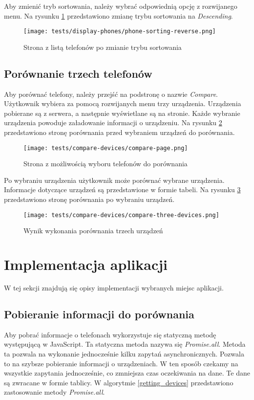 Aby zmienić tryb sortowania, należy wybrać odpowiednią opcję z rozwijanego menu. Na rysunku \ref{reverse_sorting} przedstawiono zmianę trybu sortowania na \textit{Descending}.
\begin{figure}[H]
  \centering
  \texttt{[image: tests/display-phones/phone-sorting-reverse.png]}
  \caption{Strona z listą telefonów po zmianie trybu sortowania}
  \label{reverse_sorting}
\end{figure}

\subsection{Porównanie trzech telefonów}
Aby porównać telefony, należy przejść na podstronę o nazwie \textit{Compare}. Użytkownik wybiera za pomocą rozwijanych menu trzy urządzenia. Urządzenia pobierane są z serwera, a następnie wyświetlane są na stronie. Każde wybranie urządzenia powoduje załadowanie informacji o urządzeniu. Na rysunku \ref{compare_page} przedstawiono stronę porównania przed wybraniem urządzeń do porównania.
\begin{figure}[H]
  \centering
  \texttt{[image: tests/compare-devices/compare-page.png]}
  \caption{Strona z możliwością wyboru telefonów do porównania}
  \label{compare_page}
\end{figure}

Po wybraniu urządzenia użytkownik może porównać wybrane urządzenia. Informacje dotyczące urządzeń są przedstawione w formie tabeli. Na rysunku \ref{compare_three_devices} przedstawiono stronę porównania po wybraniu urządzeń.

\begin{figure}[H]
  \centering
  \texttt{[image: tests/compare-devices/compare-three-devices.png]}
  \caption{Wynik wykonania porównania trzech urządzeń}
  \label{compare_three_devices}
\end{figure}

\section[Implementacja \texorpdfstring{\\ aplikacji}{}]{Implementacja aplikacji}
W tej sekcji znajdują się opisy implementacji wybranych miejsc aplikacji.

\subsection{Pobieranie informacji do porównania}
Aby pobrać informacje o telefonach wykorzystuje się statyczną metodę występującą w JavaScript. Ta statyczna metoda nazywa się \textit{Promise.all}. Metoda ta pozwala na wykonanie jednocześnie kilku zapytań asynchronicznych. Pozwala to na szybsze pobieranie informacji o urządzeniach. W ten sposób czekamy na wszystkie zapytania jednocześnie, co zmniejsza czas oczekiwania na dane. Te dane są zwracane w formie tablicy. W algorytmie \ref{getting_devices} przedstawiono zastosowanie metody \textit{Promise.all}.

